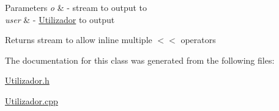 \begin{DoxyParams}{Parameters}
{\em o} & -\/ stream to output to \\
\hline
{\em user} & -\/ \hyperlink{class_utilizador}{Utilizador} to output \\
\hline
\end{DoxyParams}
\begin{DoxyReturn}{Returns}
stream to allow inline multiple $<$$<$ operators 
\end{DoxyReturn}


The documentation for this class was generated from the following files\+:\begin{DoxyCompactItemize}
\item 
\hyperlink{_utilizador_8h}{Utilizador.\+h}\item 
\hyperlink{_utilizador_8cpp}{Utilizador.\+cpp}\end{DoxyCompactItemize}
